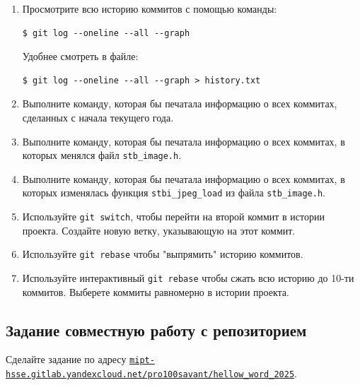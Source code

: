 \documentclass{article}
\begin{document}
\begin{enumerate}
\item Просмотрите всю историю коммитов с помощью команды:
\begin{lstlisting}[style=csMiptBash]
$ git log --oneline --all --graph
\end{lstlisting}
Удобнее смотреть в файле:
\begin{lstlisting}[style=csMiptBash]
$ git log --oneline --all --graph > history.txt
\end{lstlisting}
\item Выполните команду, которая бы печатала информацию о всех коммитах, сделанных с начала текущего года.
\item Выполните команду, которая бы печатала информацию о всех коммитах, в которых менялся файл \texttt{stb\_image.h}.
\item Выполните команду, которая бы печатала информацию о всех коммитах, в которых изменялась функция \texttt{stbi\_jpeg\_load} из файла \texttt{stb\_image.h}.
\item Используйте \texttt{git switch}, чтобы перейти на второй коммит в истории проекта. Создайте новую ветку, указывающую на этот коммит.
\item Используйте \texttt{git rebase} чтобы "выпрямить"{} историю коммитов.
\item Используйте интерактивный \texttt{git rebase} чтобы сжать всю историю до 10-ти коммитов. Выберете коммиты равномерно в истории проекта. 
\end{enumerate}



\subsection{Задание совместную работу с репозиторием}
Сделайте задание по адресу  \texttt{\href{https://mipt-hsse.gitlab.yandexcloud.net/pro100savant/hellow_word_2025}{mipt-hsse.gitlab.yandexcloud.net/pro100savant/hellow\_word\_2025}}.
\end{document}
